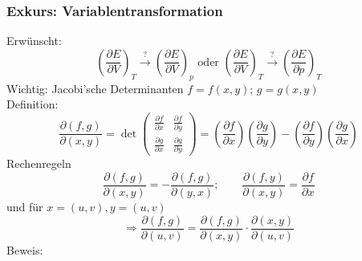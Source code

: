 \subsubsection{Exkurs: Variablentransformation}
Erwünscht:
\begin{equation}
    \left( \frac{\partial E}{\partial V} \right)_T \overset{?}{\rightarrow} \left( \frac{\partial E}{\partial V} \right)_p
    \text{ oder }
    \left( \frac{\partial E}{\partial V} \right)_T \overset{?}{\rightarrow} \left( \frac{\partial E}{\partial p} \right)_T
\end{equation}
Wichtig: Jacobi'sche Determinanten $f=f(x, y)$; $g=g(x, y)$ \\
Definition:
\begin{equation}
    \frac{\partial (f, g)}{\partial(x, y)} = \det
    \begin{pmatrix}
\frac{\partial f}{\partial x} & \frac{\partial f}{\partial y} \\
\frac{\partial g}{\partial x} & \frac{\partial g}{\partial y}
\end{pmatrix}
= \left( \frac{\partial f}{\partial x} \right) \left( \frac{\partial g}{\partial
y} \right) - \left( \frac{\partial f}{\partial y} \right) \left( \frac{\partial g}{\partial x} \right)
\end{equation}
Rechenregeln
\begin{equation}
    \frac{\partial(f, g)}{\partial(x, y)} = -\frac{\partial(f, g)}{\partial(y, x)}; \qquad
    \frac{\partial(f, y)}{\partial(x, y)} = \frac{\partial f}{\partial x}
\end{equation}
und für $x=(u, v), y=(u, v)$
\begin{equation}
    \Rightarrow \frac{\partial(f, g)}{\partial(u, v)} = \frac{\partial(f, g)}{\partial(x, y)} \cdot \frac{\partial(x, y)}{\partial(u, v)}
\end{equation}
Beweis:
